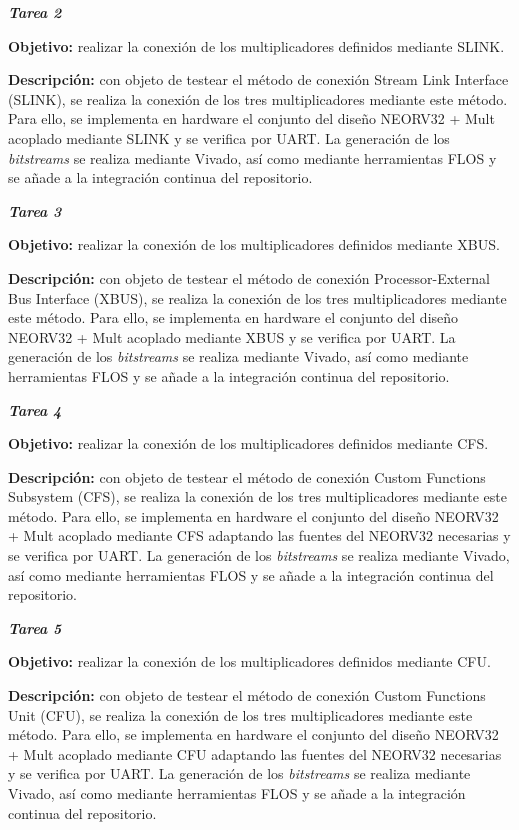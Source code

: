 \noindent \textbf{\textit{Tarea 2}}

\textbf{Objetivo:} realizar la conexión de los multiplicadores definidos mediante SLINK. 

\textbf{Descripción:} con objeto de testear el método de conexión Stream Link Interface (SLINK), se realiza la conexión de los tres multiplicadores mediante este método.
Para ello, se implementa en hardware el conjunto del diseño NEORV32 + Mult acoplado mediante SLINK y se verifica por UART.
La generación de los \textit{bitstreams} se realiza mediante Vivado, así como mediante herramientas FLOS y se añade a la integración continua del repositorio. 

\noindent \textbf{\textit{Tarea 3}}

\textbf{Objetivo:} realizar la conexión de los multiplicadores definidos mediante XBUS. 

\textbf{Descripción:} con objeto de testear el método de conexión Processor-External Bus Interface (XBUS), se realiza la conexión de los tres multiplicadores mediante este método.
Para ello, se implementa en hardware el conjunto del diseño NEORV32 + Mult acoplado mediante XBUS y se verifica por UART.
La generación de los \textit{bitstreams} se realiza mediante Vivado, así como mediante herramientas FLOS y se añade a la integración continua del repositorio. 

\noindent \textbf{\textit{Tarea 4}}

\textbf{Objetivo:} realizar la conexión de los multiplicadores definidos mediante CFS. 

\textbf{Descripción:} con objeto de testear el método de conexión Custom Functions Subsystem (CFS), se realiza la conexión de los tres multiplicadores mediante este método.
Para ello, se implementa en hardware el conjunto del diseño NEORV32 + Mult acoplado mediante CFS adaptando las fuentes del NEORV32 necesarias y se verifica por UART.
La generación de los \textit{bitstreams} se realiza mediante Vivado, así como mediante herramientas FLOS y se añade a la integración continua del repositorio. 

\noindent \textbf{\textit{Tarea 5}}

\textbf{Objetivo:} realizar la conexión de los multiplicadores definidos mediante CFU. 

\textbf{Descripción:} con objeto de testear el método de conexión Custom Functions Unit (CFU), se realiza la conexión de los tres multiplicadores mediante este método.
Para ello, se implementa en hardware el conjunto del diseño NEORV32 + Mult acoplado mediante CFU adaptando las fuentes del NEORV32 necesarias y se verifica por UART.
La generación de los \textit{bitstreams} se realiza mediante Vivado, así como mediante herramientas FLOS y se añade a la integración continua del repositorio. 

